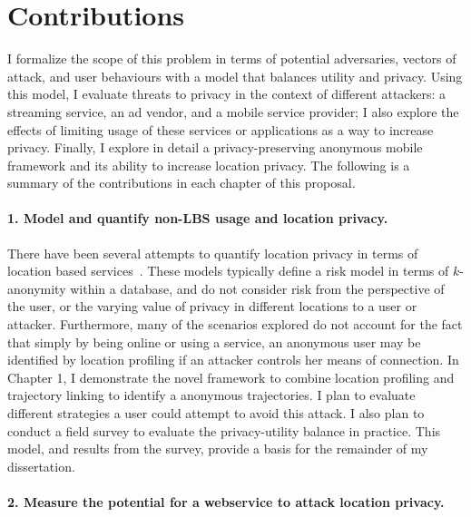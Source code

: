 \section*{Contributions}
I formalize the scope of this problem in terms of potential adversaries, vectors of attack, and user behaviours with a model that balances utility and privacy. Using this model, I evaluate threats to privacy in the context of different attackers: a streaming service, an ad vendor, and a mobile service provider; I also explore the effects of limiting usage of these services or applications as a way to increase privacy. Finally, I explore in detail a privacy-preserving anonymous mobile framework and its ability to increase location privacy. The following is a summary of the contributions in each chapter of this proposal. 

\paragraph*{1. Model and quantify non-LBS usage and location privacy.}

There have been several attempts to quantify location privacy in terms of location based services~\cite{shokri2011quantifying,krumm2009survey}. These models typically define a risk model in terms of $k$-anonymity within a database, and do not consider risk from the perspective of the user, or the varying value of privacy in different locations to a user or attacker. Furthermore, many of the scenarios explored do not account for the fact that simply by being online or using a service, an anonymous user may be identified by location profiling if an attacker controls her means of connection. In Chapter 1, I demonstrate the novel framework to combine location profiling and trajectory linking to identify a anonymous trajectories. I plan to evaluate different strategies a user could attempt to avoid this attack. I also plan to conduct a field survey to evaluate the privacy-utility balance in practice. This model, and results from the survey, provide a basis for the remainder of my dissertation.


\paragraph*{2. Measure the potential for a webservice to attack location privacy.}

